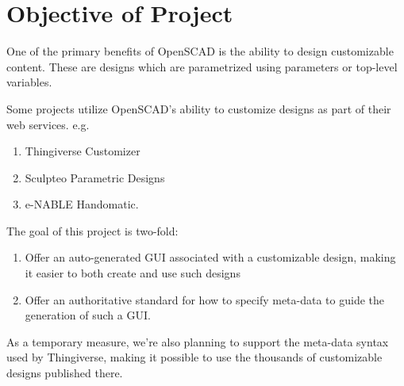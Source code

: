 \section{Objective of Project}

One of the primary benefits of OpenSCAD is the ability to design customizable content. These are designs which are parametrized using parameters or top-level variables.


Some projects utilize OpenSCAD's ability to customize designs as part of their web services.
e.g. 
\begin{enumerate}
	\item Thingiverse Customizer
	\item  Sculpteo Parametric Designs
	\item e-NABLE Handomatic.
\end{enumerate}


The goal of this project is two-fold:
\begin{enumerate}
	\item  Offer an auto-generated GUI associated with a customizable design, making it easier to both create and use such designs
	\item Offer an authoritative standard for how to specify meta-data to guide the generation of such a GUI.
	
\end{enumerate}

As a temporary measure, we're also planning to support the meta-data syntax used by Thingiverse, making it possible to use the thousands of customizable designs published there.


%	
%	

